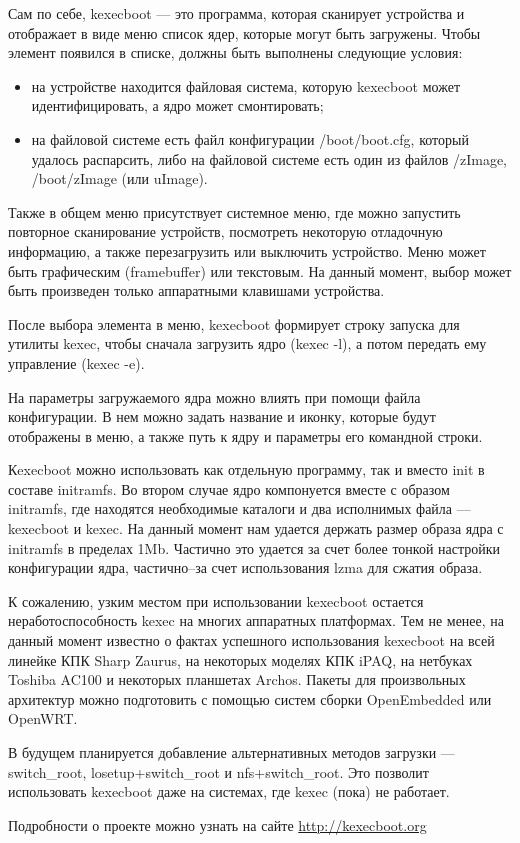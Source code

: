 \documentclass[10pt, a5paper]{article}
\begin{document}
Сам по себе, kexecboot --- это программа, которая сканирует устройства и отображает в виде меню список ядер, которые могут быть загружены. Чтобы элемент появился в списке, должны быть выполнены следующие условия:
\begin{itemize}
\item на устройстве находится файловая система, которую kexecboot может идентифицировать, а ядро может смонтировать;
\item на файловой системе есть файл конфигурации /boot/boot.cfg, который удалось распарсить, либо на файловой системе есть один из файлов /zImage, /boot/zImage (или uImage).
\end{itemize}

Также в общем меню присутствует системное меню, где можно запустить повторное сканирование устройств, посмотреть некоторую отладочную информацию, а также перезагрузить или выключить устройство. Меню может быть графическим (framebuffer) или текстовым. На данный момент, выбор может быть произведен только  аппаратными клавишами устройства.

После выбора элемента в меню, kexecboot формирует строку запуска для утилиты kexec, чтобы сначала загрузить ядро (kexec -l), а потом передать ему управление (kexec -e).

На параметры загружаемого ядра можно влиять при помощи файла конфигурации. В нем можно задать название и иконку, которые будут отображены в меню, а также путь к ядру и параметры его командной строки.

Кexecboot можно использовать как отдельную программу, так и вместо init в составе initramfs. Во втором случае ядро компонуется вместе с образом initramfs, где находятся необходимые каталоги и два исполнимых файла — kexecboot и kexec. На данный момент нам удается держать размер образа ядра с initramfs в пределах 1Mb. Частично это удается за счет более тонкой настройки конфигурации ядра, частично--за счет использования lzma для сжатия образа.

К сожалению, узким местом при использовании kexecboot остается неработоспособность kexec на многих аппаратных платформах. Тем не менее, на данный момент известно о фактах успешного использования kexecboot на всей линейке КПК Sharp Zaurus, на некоторых моделях КПК iPAQ, на нетбуках Toshiba AC100 и некоторых планшетах Archos. Пакеты для произвольных архитектур можно подготовить с помощью систем сборки OpenEmbedded или OpenWRT.

В будущем планируется добавление альтернативных методов загрузки — switch\_root, losetup+switch\_root и nfs+switch\_root. Это позволит использовать kexecboot даже на системах, где kexec (пока) не работает.

Подробности о проекте можно узнать на сайте \url{http://kexecboot.org}
\end{document}
